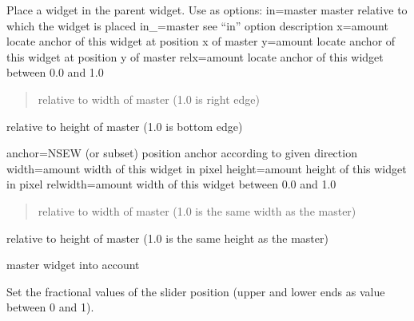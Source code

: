 \documentclass[letterpaper,10pt,spanish]{sphinxmanual}
\begin{document}
\begin{fulllineitems}
\begin{fulllineitems}
\label{\detokenize{probeDesignerUI:probeDesignerUI.AutoScrollbar.place}}
\pysigstartsignatures
{}
\pysigstopsignatures
\sphinxAtStartPar
Place a widget in the parent widget. Use as options:
in=master \sphinxhyphen{} master relative to which the widget is placed
in\_=master \sphinxhyphen{} see “in” option description
x=amount \sphinxhyphen{} locate anchor of this widget at position x of master
y=amount \sphinxhyphen{} locate anchor of this widget at position y of master
relx=amount \sphinxhyphen{} locate anchor of this widget between 0.0 and 1.0
\begin{quote}

\sphinxAtStartPar
relative to width of master (1.0 is right edge)
\end{quote}
\begin{description}
\sphinxAtStartPar
relative to height of master (1.0 is bottom edge)

\end{description}

\sphinxAtStartPar
anchor=NSEW (or subset) \sphinxhyphen{} position anchor according to given direction
width=amount \sphinxhyphen{} width of this widget in pixel
height=amount \sphinxhyphen{} height of this widget in pixel
relwidth=amount \sphinxhyphen{} width of this widget between 0.0 and 1.0
\begin{quote}

\sphinxAtStartPar
relative to width of master (1.0 is the same width
as the master)
\end{quote}
\begin{description}
\sphinxAtStartPar
relative to height of master (1.0 is the same
height as the master)

\sphinxAtStartPar
master widget into account

\end{description}

\end{fulllineitems}


\begin{fulllineitems}
\label{\detokenize{probeDesignerUI:probeDesignerUI.AutoScrollbar.set}}
\pysigstartsignatures
{}
\pysigstopsignatures
\sphinxAtStartPar
Set the fractional values of the slider position (upper and
lower ends as value between 0 and 1).

\end{fulllineitems}


\end{fulllineitems}
\end{document}
